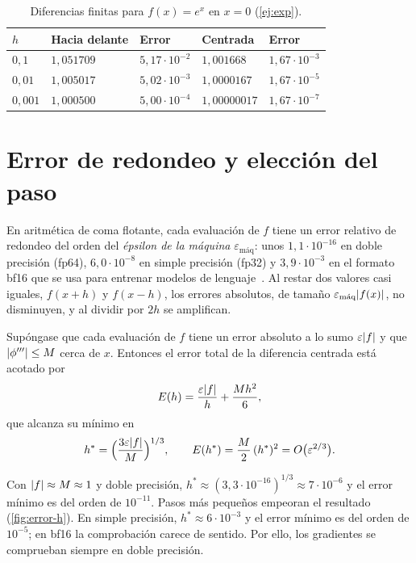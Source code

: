 \addtocounter{definicion}{1}%

\begin{table}[h]
\centering\small
\caption{Diferencias finitas para $f(x)=e^{x}$ en $x=0$ (\cref{ej:exp}).}\label{tab:exp}
\begin{tabular}{@{}lllll@{}}
\toprule
$h$ & Hacia delante & Error & Centrada & Error \\
\midrule
$0{,}1$ & $1{,}051709$ & $5{,}17\cdot 10^{-2}$ & $1{,}001668$ & $1{,}67\cdot 10^{-3}$ \\
$0{,}01$ & $1{,}005017$ & $5{,}02\cdot 10^{-3}$ & $1{,}0000167$ & $1{,}67\cdot 10^{-5}$ \\
$0{,}001$ & $1{,}000500$ & $5{,}00\cdot 10^{-4}$ & $1{,}00000017$ & $1{,}67\cdot 10^{-7}$ \\
\bottomrule
\end{tabular}
\end{table}

\section{Error de redondeo y elección del paso}

En aritmética de coma flotante, cada evaluación de $f$ tiene un error relativo de redondeo del orden del \emph{épsilon de la máquina} $\varepsilon_{\text{máq}}$: unos $1{,}1\cdot 10^{-16}$ en doble precisión (fp64), $6{,}0\cdot 10^{-8}$ en simple precisión (fp32) y $3{,}9\cdot 10^{-3}$ en el formato bf16 que se usa para entrenar modelos de lenguaje~\cite[§4.1]{gbc}. Al restar dos valores casi iguales, $f(x+h)$ y $f(x-h)$, los errores absolutos, de tamaño $\varepsilon_{\text{máq}}\lvert f(x)\rvert$, no disminuyen, y al dividir por $2h$ se amplifican.

\begin{proposicion}\label{prop:h-optimo}
Supóngase que cada evaluación de $f$ tiene un error absoluto a lo sumo $\varepsilon\lvert f\rvert$ y que $\lvert\phi'''\rvert\le M$ cerca de $x$. Entonces el error total de la diferencia centrada está acotado por
\[
E(h)=\frac{\varepsilon\lvert f\rvert}{h}+\frac{M h^{2}}{6},
\]
que alcanza su mínimo en
\[
h^{*}=\Bigl(\frac{3\varepsilon\lvert f\rvert}{M}\Bigr)^{1/3},\qquad E(h^{*})=\frac{M}{2}\,(h^{*})^{2}=O\bigl(\varepsilon^{2/3}\bigr).
\]
\end{proposicion}

Con $\lvert f\rvert\approx M\approx 1$ y doble precisión, $h^{*}\approx(3{,}3\cdot 10^{-16})^{1/3}\approx 7\cdot 10^{-6}$ y el error mínimo es del orden de $10^{-11}$. Pasos más pequeños empeoran el resultado (\cref{fig:error-h}). En simple precisión, $h^{*}\approx 6\cdot 10^{-3}$ y el error mínimo es del orden de $10^{-5}$; en bf16 la comprobación carece de sentido. Por ello, los gradientes se comprueban siempre en doble precisión.

